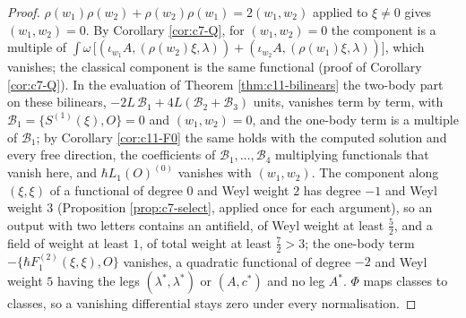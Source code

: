 \begin{proof}
$\rho(w_1)\rho(w_2)+\rho(w_2)\rho(w_1)=2(w_1,w_2)$ applied to $\xi\ne0$ gives $(w_1,w_2)=0$. By Corollary \ref{cor:c7-Q}, for $(w_1,w_2)=0$ the component is a multiple of $\int\omega\,\big[(\iota_{w_1}A,(\rho(w_2)\xi,\lambda))+(\iota_{w_2}A,(\rho(w_1)\xi,\lambda))\big]$, which vanishes; the classical component is the same functional (proof of Corollary \ref{cor:c7-Q}). In the evaluation of Theorem \ref{thm:c11-bilinears} the two-body part on these bilinears, $-2L\,\mathcal B_1+4L(\mathcal B_2+\mathcal B_3)$ units, vanishes term by term, with $\mathcal B_1=\{S^{(1)}(\xi),O\}=0$ and $(w_1,w_2)=0$, and the one-body term is a multiple of $\mathcal B_1$; by Corollary \ref{cor:c11-F0} the same holds with the computed solution and every free direction, the coefficients of $\mathcal B_1,\dots,\mathcal B_4$ multiplying functionals that vanish here, and $\hbar L_1(O)^{(0)}$ vanishes with $(w_1,w_2)$. The component along $(\xi,\xi)$ of a functional of degree $0$ and Weyl weight $2$ has degree $-1$ and Weyl weight $3$ (Proposition \ref{prop:c7-select}, applied once for each argument), so an output with two letters contains an antifield, of Weyl weight at least $\tfrac52$, and a field of weight at least $1$, of total weight at least $\tfrac72>3$; the one-body term $-\{\hbar F_1^{(2)}(\xi,\xi),O\}$ vanishes, a quadratic functional of degree $-2$ and Weyl weight $5$ having the legs $(\lambda^*,\lambda^*)$ or $(A,c^*)$ and no leg $A^*$. $\Phi$ maps classes to classes, so a vanishing differential stays zero under every normalisation.
\end{proof}
